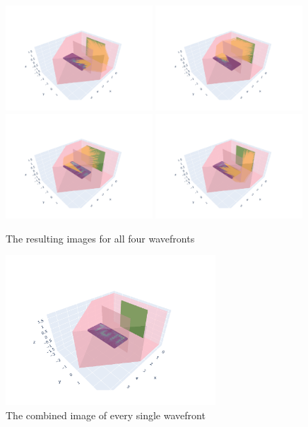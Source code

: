 \begin{figure}[hp]
    \centering
    \includegraphics[width=0.49\textwidth]{figures/result_multipath_nlos_wf1.pdf}
    \includegraphics[width=0.49\textwidth]{figures/result_multipath_nlos_wf2.pdf}
    \includegraphics[width=0.49\textwidth]{figures/result_multipath_nlos_wf3.pdf}
    \includegraphics[width=0.49\textwidth]{figures/result_multipath_nlos_wf4.pdf}
    \caption{The resulting images for all four wavefronts}\label{fig:MultipathNLOS_results}
    
    \includegraphics[width=0.7\textwidth]{figures/result_multipath_nlos_combined.pdf}
    \caption{The combined image of every single wavefront}\label{fig:MultipathNLOS_combined}
\end{figure}


